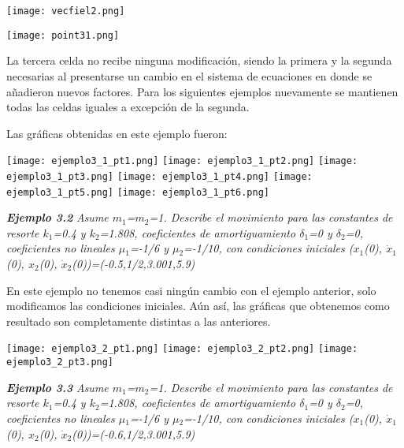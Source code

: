 \documentclass{article}
\begin{document}
\begin{center}
\texttt{[image: vecfiel2.png]}
\end{center}

\begin{center}
\texttt{[image: point31.png]}
\end{center}

La tercera celda no recibe ninguna modificación, siendo la primera y la segunda necesarias al presentarse un cambio en el sistema de ecuaciones en donde se añadieron nuevos factores. Para los siguientes ejemplos nuevamente se mantienen todas las celdas iguales a excepción de la segunda. 

Las gráficas obtenidas en este ejemplo fueron:

\begin{center}
\texttt{[image: ejemplo3\_1\_pt1.png]}
\texttt{[image: ejemplo3\_1\_pt2.png]}
\texttt{[image: ejemplo3\_1\_pt3.png]}
\texttt{[image: ejemplo3\_1\_pt4.png]}
\texttt{[image: ejemplo3\_1\_pt5.png]}
\texttt{[image: ejemplo3\_1\_pt6.png]}
\end{center}

\textbf{\textit{Ejemplo 3.2}}
\textit{Asume $m_1$=$m_2$=1. Describe el movimiento para las constantes de resorte $k_1$=0.4 y $k_2$=1.808, coeficientes de amortiguamiento $\delta$$_1$=0 y $\delta$$_2$=0, coeficientes no lineales $\mu$$_1$=-1/6 y $\mu$$_2$=-1/10, con condiciones iniciales ($x_1$(0), $\dot{x}_1$(0), $x_2$(0), $\dot{x}_2$(0))=(-0.5,1/2,3.001,5.9)}

En este ejemplo no tenemos casi ningún cambio con el ejemplo anterior, solo modificamos las condiciones iniciales. Aún así, las gráficas que obtenemos como resultado son completamente distintas a las anteriores.

\begin{center}
\texttt{[image: ejemplo3\_2\_pt1.png]}
\texttt{[image: ejemplo3\_2\_pt2.png]}
\texttt{[image: ejemplo3\_2\_pt3.png]}
\end{center}

\textbf{\textit{Ejemplo 3.3}}
\textit{Asume $m_1$=$m_2$=1. Describe el movimiento para las constantes de resorte $k_1$=0.4 y $k_2$=1.808, coeficientes de amortiguamiento $\delta$$_1$=0 y $\delta$$_2$=0, coeficientes no lineales $\mu$$_1$=-1/6 y $\mu$$_2$=-1/10, con condiciones iniciales ($x_1$(0), $\dot{x}_1$(0), $x_2$(0), $\dot{x}_2$(0))=(-0.6,1/2,3.001,5.9)}
\end{document}
